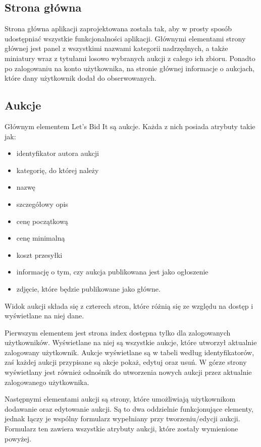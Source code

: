 \documentclass[brudnopis]{xmgr}
\begin{document}
\subsection{Strona główna}

Strona główna aplikacji zaprojektowana została tak, aby w prosty sposób udostępniać wszystkie funkcjonalności aplikacji. Głównymi elementami strony głównej jest panel z wszystkimi nazwami kategorii nadrzędnych, a także miniatury wraz z tytułami losowo wybranych aukcji z całego ich zbioru. Ponadto po zalogowaniu na konto użytkownika, na stronie głównej informacje o aukcjach, które dany użytkownik dodał do obserwowanych.

\subsection{Aukcje}

Głównym elementem Let's Bid It są aukcje. Każda z nich posiada atrybuty takie jak:
\begin{itemize}

\item identyfikator autora aukcji
\item kategorię, do której należy
\item nazwę
\item szczegółowy opis
\item cenę początkową
\item cenę minimalną
\item koszt przesyłki
\item informację o tym, czy aukcja publikowana jest jako ogłoszenie
\item zdjęcie, które będzie publikowane jako główne.

\end{itemize}

Widok aukcji składa się z czterech stron, które różnią się ze względu na dostęp i wyświetlane na niej dane.

Pierwszym elementem jest strona index dostępna tylko dla zalogowanych użytkowników. Wyświetlane na niej są wszystkie aukcje, które utworzył aktualnie zalogowany użytkownik. Aukcje wyświetlane są w tabeli według identyfikatorów, zaś każdej aukcji przypisane są akcje pokaż, edytuj oraz usuń. W górze strony wyświetlany jest również odnośnik do utworzenia nowych aukcji przez aktualnie zalogowanego użytkownika.

Następnymi elementami aukcji są strony, które umożliwiają użytkownikom dodawanie oraz edytowanie aukcji. Są to dwa oddzielnie funkcjonujące elementy, jednak łączy je wspólny formularz wypełniany przy tworzeniu/edycji aukcji. Formularz ten zawiera wszystkie atrybuty aukcji, które zostały wymienione powyżej.
\end{document}
